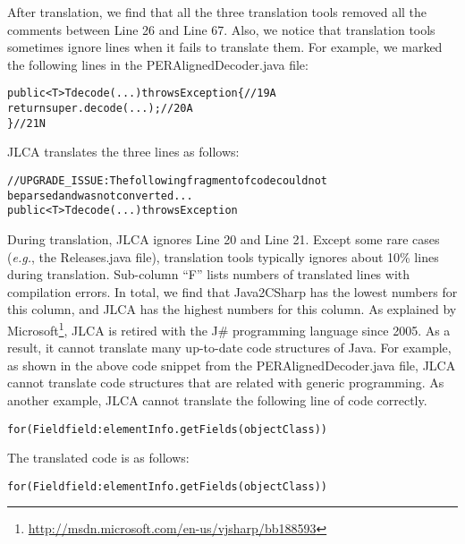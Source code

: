 After translation, we find that all the three translation tools removed all the comments between Line 26 and Line 67. Also, we notice that translation tools sometimes ignore lines when it fails to translate them. For example, we marked the following lines in the PERAlignedDecoder.java file:

\begin{CodeOut}%
\begin{alltt}
public <T> T decode(...) throws Exception \{//19A
  return super.decode(...);//20A
\}//21N
\end{alltt}
\end{CodeOut}

JLCA translates the three lines as follows:
\begin{CodeOut}%
\begin{alltt}
//UPGRADE_ISSUE: The following fragment of code could not
   be parsed and was not converted...
public < T > T decode(...) throws Exception
\end{alltt}
\end{CodeOut}

During translation, JLCA ignores Line 20 and Line 21. Except some rare cases (\emph{e.g.}, the Releases.java file), translation tools typically ignores about 10\% lines during translation. Sub-column ``F'' lists numbers of translated lines with compilation errors. In total, we find that Java2CSharp has the lowest numbers for this column, and JLCA has the highest numbers for this column. As explained by Microsoft\footnote{\url{http://msdn.microsoft.com/en-us/vjsharp/bb188593}}, JLCA is retired with the J\# programming language since 2005. As a result, it cannot translate many up-to-date code structures of Java. For example, as shown in the above code snippet from the PERAlignedDecoder.java file, JLCA cannot translate code structures that are related with generic programming. As another example, JLCA cannot translate the following line of code correctly.

\begin{CodeOut}%
\begin{alltt}
for(Field field : elementInfo.getFields(objectClass))
\end{alltt}
\end{CodeOut}

The translated code is as follows:

\begin{CodeOut}%
\begin{alltt}
for(Field field: elementInfo.getFields(objectClass))
\end{alltt}
\end{CodeOut}

